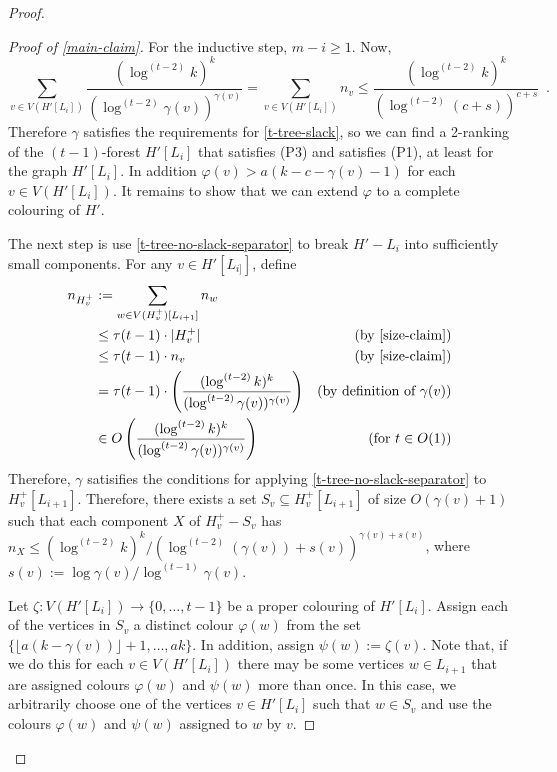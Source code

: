 \documentclass[kpfonts]{patmorin}
\theoremstyle{named}
\begin{document}
\begin{proof}
\begin{proof}[Proof of \cref{main-claim}]
        For the inductive step, $m-i\ge 1$.
        Now,
        \[
            \sum_{v\in V(H'[L_i])}\frac{(\log^{(t-2)} k)^k}{(\log^{(t-2)} \gamma(v))^{\gamma(v)}}
            = \sum_{v\in V(H'[L_i])} n_v
            \le \frac{(\log^{(t-2)} k)^k}{(\log^{(t-2)} (c+s))^{c+s}} \enspace .
        \]
       Therefore $\gamma$ satisfies the requirements for \cref{t-tree-slack}, so we can find a 2-ranking of the $(t-1)$-forest $H'[L_i]$ that satisfies (P3) and satisfies (P1), at least for the graph $H'[L_i]$. In addition $\varphi(v)> a(k-c-\gamma(v)-1)$ for each $v\in V(H'[L_i])$.  It remains to show that we can extend $\varphi$ to a complete colouring of $H'$.

       The next step is use \cref{t-tree-no-slack-separator} to break $H'-L_i$ into sufficiently small components.  For any $v\in H'[L_{i]}]$, define
       \begin{align*}
          n_{H^+_v} & := \sum_{w\in V(H^+_v)[L_{i+1}]} n_w \\
                    & \le \tau(t-1)\cdot|H^+_v| & \text{(by \cref{size-claim})} \\
                    & \le \tau(t-1)\cdot n_v & \text{(by \cref{size-claim})} \\
                    & = \tau(t-1)\cdot\left(\frac{(\log^{(t-2)}k)^k}{(\log^{(t-2)}\gamma(v))^{\gamma(v)}}\right)
                    & \text{(by definition of $\gamma(v)$)} \\
                    & \in O\left(\frac{(\log^{(t-2)}k)^k}{(\log^{(t-2)}\gamma(v))^{\gamma(v)}}\right) &\text{(for $t\in O(1)$)}
       \end{align*}
       Therefore, $\gamma$ satisifies the conditions for applying \cref{t-tree-no-slack-separator} to $H^+_v[L_{i+1}]$.  Therefore, there exists a set $S_v\subseteq H^+_v[L_{i+1}]$ of size $O(\gamma(v)+1)$ such that each component $X$ of $H^+_v-S_v$ has $n_X\le (\log^{(t-2)} k)^k/(\log^{(t-2)} (\gamma(v))+s(v))^{\gamma(v)+s(v)}$, where $s(v):=\log\gamma(v)/\log^{(t-1)}\gamma(v)$.

       Let $\zeta:V(H'[L_i])\to\{0,\ldots,t-1\}$ be a proper colouring of $H'[L_i]$.  Assign each of the vertices in $S_v$ a distinct colour $\varphi(w)$ from the set $\{\lfloor a(k-\gamma(v))\rfloor+1,\ldots,ak\}$.  In addition, assign $\psi(w):=\zeta(v)$.  Note that, if we do this for each $v\in V(H'[L_i])$ there may be some vertices $w\in L_{i+1}$ that are assigned colours $\varphi(w)$ and $\psi(w)$ more than once.  In this case, we arbitrarily choose one of the vertices $v\in H'[L_i]$ such that $w\in S_v$ and use the colours $\varphi(w)$ and $\psi(w)$ assigned to $w$ by $v$.


\end{proof}
\end{proof}
\end{document}

